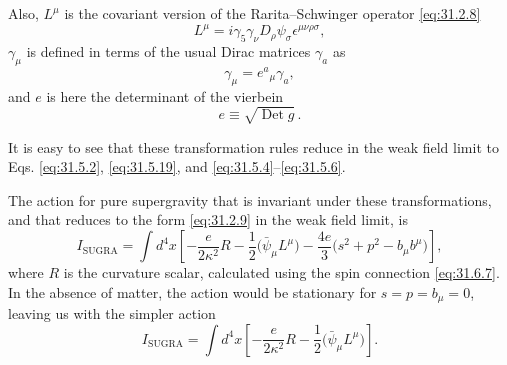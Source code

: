 Also, \(L^\mu\) is the covariant version of the Rarita--Schwinger
operator \eqref{eq:31.2.8}
\begin{equation}
  L^\mu=i\gamma_5\gamma_\nu D_\rho\psi_\sigma
    \epsilon^{\mu\nu\rho\sigma},
  \tag{31.6.8}\label{eq:31.6.8}
\end{equation}
\(\gamma_\mu\) is defined in terms of the usual Dirac matrices
\(\gamma_a\) as
\begin{equation}
  \gamma_\mu=e^a{}_\mu\gamma_a,
  \tag{31.6.9}\label{eq:31.6.9}
\end{equation}
and \(e\) is here the determinant of the vierbein
\begin{equation}
  e\equiv\sqrt{\operatorname{Det}g}\,.
  \tag{31.6.10}\label{eq:31.6.10}
\end{equation}

It is easy to see that these transformation rules reduce in the weak
field limit to Eqs. \eqref{eq:31.5.2}, \eqref{eq:31.5.19}, and
\eqref{eq:31.5.4}--\eqref{eq:31.5.6}.

The action for pure supergravity that is invariant under these
transformations, and that reduces to the form \eqref{eq:31.2.9} in the
weak field limit, is
\begin{equation}
  I_{\mathrm{SUGRA}}
  =\int d^4x\left[
    -\frac{e}{2\kappa^2}R
    -\frac{1}{2}\bigl(\bar\psi_\mu L^\mu\bigr)
    -\frac{4e}{3}\bigl(s^2+p^2-b_\mu b^\mu\bigr)
  \right],
  \tag{31.6.11}\label{eq:31.6.11}
\end{equation}
where \(R\) is the curvature scalar, calculated using the spin
connection \eqref{eq:31.6.7}. In the absence of matter, the action would
be stationary for \(s=p=b_\mu=0\), leaving us with the simpler action
\[
  I_{\mathrm{SUGRA}}
  =\int d^4x\left[
    -\frac{e}{2\kappa^2}R
    -\frac{1}{2}\bigl(\bar\psi_\mu L^\mu\bigr)
  \right].
\]

